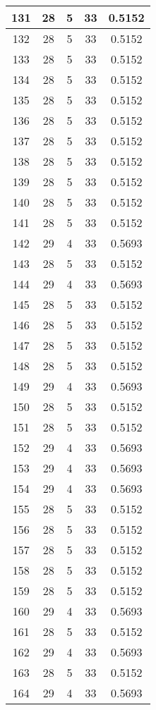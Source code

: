 \documentclass[letterpaper, 12pt]{article}
\begin{document}
\begin{longtable}{|c|c|c|c|c|}
\hline
131 & 28 & 5 & 33 & 0.5152 \\
\hline
132 & 28 & 5 & 33 & 0.5152 \\
\hline
133 & 28 & 5 & 33 & 0.5152 \\
\hline
134 & 28 & 5 & 33 & 0.5152 \\
\hline
135 & 28 & 5 & 33 & 0.5152 \\
\hline
136 & 28 & 5 & 33 & 0.5152 \\
\hline
137 & 28 & 5 & 33 & 0.5152 \\
\hline
138 & 28 & 5 & 33 & 0.5152 \\
\hline
139 & 28 & 5 & 33 & 0.5152 \\
\hline
140 & 28 & 5 & 33 & 0.5152 \\
\hline
141 & 28 & 5 & 33 & 0.5152 \\
\hline
142 & 29 & 4 & 33 & 0.5693 \\
\hline
143 & 28 & 5 & 33 & 0.5152 \\
\hline
144 & 29 & 4 & 33 & 0.5693 \\
\hline
145 & 28 & 5 & 33 & 0.5152 \\
\hline
146 & 28 & 5 & 33 & 0.5152 \\
\hline
147 & 28 & 5 & 33 & 0.5152 \\
\hline
148 & 28 & 5 & 33 & 0.5152 \\
\hline
149 & 29 & 4 & 33 & 0.5693 \\
\hline
150 & 28 & 5 & 33 & 0.5152 \\
\hline
151 & 28 & 5 & 33 & 0.5152 \\
\hline
152 & 29 & 4 & 33 & 0.5693 \\
\hline
153 & 29 & 4 & 33 & 0.5693 \\
\hline
154 & 29 & 4 & 33 & 0.5693 \\
\hline
155 & 28 & 5 & 33 & 0.5152 \\
\hline
156 & 28 & 5 & 33 & 0.5152 \\
\hline
157 & 28 & 5 & 33 & 0.5152 \\
\hline
158 & 28 & 5 & 33 & 0.5152 \\
\hline
159 & 28 & 5 & 33 & 0.5152 \\
\hline
160 & 29 & 4 & 33 & 0.5693 \\
\hline
161 & 28 & 5 & 33 & 0.5152 \\
\hline
162 & 29 & 4 & 33 & 0.5693 \\
\hline
163 & 28 & 5 & 33 & 0.5152 \\
\hline
164 & 29 & 4 & 33 & 0.5693 \\

\end{longtable}
\end{document}
